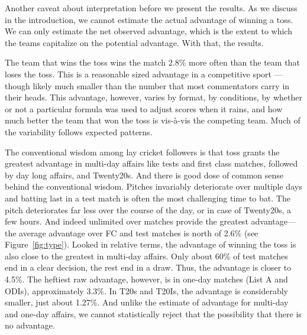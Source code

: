 \documentclass[12pt]{article}
\begin{document}
Another caveat about interpretation before we present the results. As we discuss in the introduction, we cannot estimate the actual advantage of winning a toss. We can only estimate the net observed advantage, which is the extent to which the teams capitalize on the potential advantage. With that, the results.

The team that wins the toss wins the match 2.8\% more often than the team that loses the toss. This is a reasonable sized advantage in a competitive sport --- though likely much smaller than the number that most commentators carry in their heads. This advantage, however, varies by format, by conditions, by whether or not a particular formula was used to adjust scores when it rains, and how much better the team that won the toss is vis-\`{a}-vis the competing team. Much of the variability follows expected patterns.

The conventional wisdom among lay cricket followers is that toss grants the greatest advantage in multi-day affairs like tests and first class matches, followed by day long affairs, and Twenty20s. And there is good dose of common sense behind the conventional wisdom. Pitches invariably deteriorate over multiple days and batting last in a test match is often the most challenging time to bat. The pitch deteriorates far less over the course of the day, or in case of Twenty20s, a few hours. And indeed unlimited over matches provide the greatest advantage--- the average advantage over FC and test matches is north of 2.6\% (see Figure~\ref{fig:type}). Looked in relative terms, the advantage of winning the toss is also close to the greatest in multi-day affairs. Only about 60\% of test matches end in a clear decision, the rest end in a draw. Thus, the advantage is closer to 4.5\%. The heftiest raw advantage, however, is in one-day matches (List A and ODIs), approximately 3.3\%. In T20s and T20Is, the advantage is considerably smaller, just about 1.27\%. And unlike the estimate of advantage for multi-day and one-day affairs, we cannot statistically reject that the possibility that there is no advantage.
\end{document}
